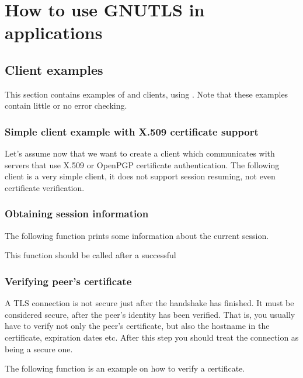 \chapter{How to use GNUTLS in applications}



\label{examples}
\section{Client examples}
This section contains examples of \tls{} and \ssl{} clients, using \gnutls{}. 
Note that these examples contain little or no error checking.

\subsection{Simple client example with X.509 certificate support}
Let's assume now that we want to create a client which communicates
with servers that use X.509 or OpenPGP certificate authentication. The following client
is a very simple \tls{} client, it does not support session resuming, not
even certificate verification.


\subsection{Obtaining session information}
The following function  prints some information about the current session.
\par
This function should be called after a successful



\subsection{Verifying peer's certificate}
\par A TLS connection is not secure just after the handshake has finished.
It must be considered secure, after the peer's identity has been
verified. That is, you usually have to verify not only the peer's 
certificate, but also the hostname in the certificate, expiration dates etc. 
After this step you should treat the connection as being a secure one.

\par
The following function is an example on how to verify a certificate.



